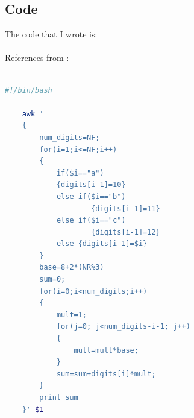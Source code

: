 \documentclass[12pt]{article}
\begin{document}
\subsection{Code}
\vspace*{2em}
The code that I wrote is:\\\\
References from : \cite{oreilly} \cite{unix} \cite{computerworld}\\\\
\begin{lstlisting}[language=bash, caption=InLab - Q2]
    #!/bin/bash

    awk '
    {
        num_digits=NF;
        for(i=1;i<=NF;i++)
        {
            if($i=="a")
            {digits[i-1]=10}
            else if($i=="b")
                    {digits[i-1]=11}
            else if($i=="c")
                    {digits[i-1]=12}
            else {digits[i-1]=$i}
        }
        base=8+2*(NR%3)
        sum=0;
        for(i=0;i<num_digits;i++)
        {
            mult=1;
            for(j=0; j<num_digits-i-1; j++)
            {
                mult=mult*base;
            }
            sum=sum+digits[i]*mult;
        }
        print sum
    }' $1 
\end{lstlisting}
\newpage
\end{document}
